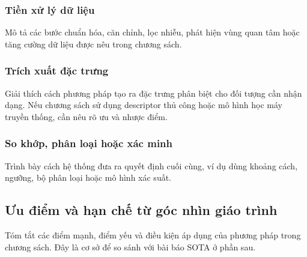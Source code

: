 \subsubsection{Tiền xử lý dữ liệu}
Mô tả các bước chuẩn hóa, căn chỉnh, lọc nhiễu, phát hiện vùng quan tâm hoặc tăng cường dữ liệu được nêu trong chương sách.

\subsubsection{Trích xuất đặc trưng}
Giải thích cách phương pháp tạo ra đặc trưng phân biệt cho đối tượng cần nhận dạng. Nếu chương sách sử dụng descriptor thủ công hoặc mô hình học máy truyền thống, cần nêu rõ ưu và nhược điểm.

\subsubsection{So khớp, phân loại hoặc xác minh}
Trình bày cách hệ thống đưa ra quyết định cuối cùng, ví dụ dùng khoảng cách, ngưỡng, bộ phân loại hoặc mô hình xác suất.

\subsection{Ưu điểm và hạn chế từ góc nhìn giáo trình}
Tóm tắt các điểm mạnh, điểm yếu và điều kiện áp dụng của phương pháp trong chương sách. Đây là cơ sở để so sánh với bài báo SOTA ở phần sau.